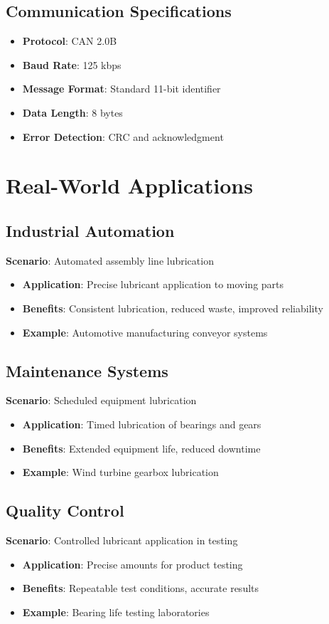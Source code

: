 \documentclass[11pt,a4paper]{article}
\begin{document}
\subsection{Communication Specifications}
\begin{itemize}
    \item \textbf{Protocol}: CAN 2.0B
    \item \textbf{Baud Rate}: 125 kbps
    \item \textbf{Message Format}: Standard 11-bit identifier
    \item \textbf{Data Length}: 8 bytes
    \item \textbf{Error Detection}: CRC and acknowledgment
\end{itemize}

\section{Real-World Applications}

\subsection{Industrial Automation}
\textbf{Scenario}: Automated assembly line lubrication
\begin{itemize}
    \item \textbf{Application}: Precise lubricant application to moving parts
    \item \textbf{Benefits}: Consistent lubrication, reduced waste, improved reliability
    \item \textbf{Example}: Automotive manufacturing conveyor systems
\end{itemize}

\subsection{Maintenance Systems}
\textbf{Scenario}: Scheduled equipment lubrication
\begin{itemize}
    \item \textbf{Application}: Timed lubrication of bearings and gears
    \item \textbf{Benefits}: Extended equipment life, reduced downtime
    \item \textbf{Example}: Wind turbine gearbox lubrication
\end{itemize}

\subsection{Quality Control}
\textbf{Scenario}: Controlled lubricant application in testing
\begin{itemize}
    \item \textbf{Application}: Precise amounts for product testing
    \item \textbf{Benefits}: Repeatable test conditions, accurate results
    \item \textbf{Example}: Bearing life testing laboratories
\end{itemize}
\end{document}

